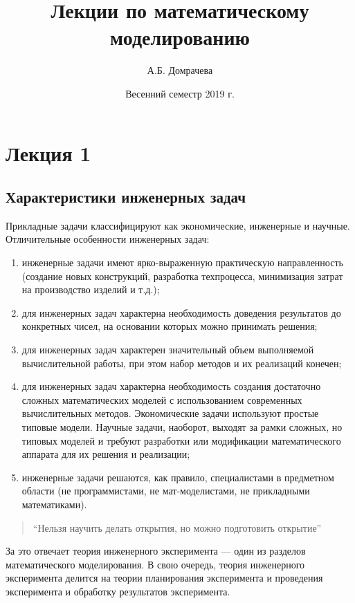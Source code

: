 \documentclass[12pt]{article}
\title{Лекции по математическому моделированию}
\author{А.Б. Домрачева}
\date{Весенний семестр 2019 г.}
\begin{document}
\maketitle
\thispagestyle{empty}

\newpage
\tableofcontents
\thispagestyle{empty}

\newpage
\section{Лекция 1}
\subsection{Характеристики инженерных задач}
Прикладные задачи классифицируют как экономические, инженерные и научные. Отличительные особенности инженерных задач:

\begin{enumerate}
    \item инженерные задачи имеют ярко-выраженную практическую направленность (создание новых конструкций, разработка техпроцесса, минимизация затрат на производство изделий и т.д.);
    \item для инженерных задач характерна необходимость доведения результатов до конкретных чисел, на основании которых можно принимать решения;
    \item для инженерных задач характерен значительный объем выполняемой вычислительной работы, при этом набор методов и их реализаций конечен;
    \item для инженерных задач характерна необходимость создания достаточно сложных математических моделей с использованием современных вычислительных методов. Экономические задачи используют простые типовые модели. Научные задачи, наоборот, выходят за рамки сложных, но типовых моделей и требуют разработки или модификации математического аппарата для их решения и реализации;
    \item инженерные задачи решаются, как правило, специалистами в предметном области (не программистами, не мат-моделистами, не прикладными математиками).
\end{enumerate}

\begin{quotation}
    \enquote{Нельзя научить делать открытия, но можно подготовить открытие}
\end{quotation}

За это отвечает теория инженерного эксперимента --- один из разделов математического моделирования. В свою очередь, теория инженерного эксперимента делится на теории планирования эксперимента и проведения эксперимента и обработку результатов эксперимента.
\end{document}
